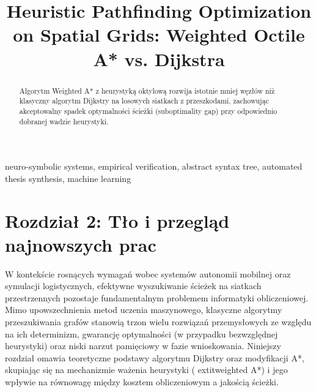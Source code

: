 \documentclass[conference]{IEEEtran}
\begin{document}
\title{Heuristic Pathfinding Optimization on Spatial Grids: Weighted Octile A* vs. Dijkstra}

\author{
}


\thispagestyle{plain}

\begin{abstract}
Algorytm Weighted A* z heurystyką oktylową rozwija istotnie mniej węzłów niż klasyczny algorytm Dijkstry na losowych siatkach z przeszkodami, zachowując akceptowalny spadek optymalności ścieżki (suboptimality gap) przy odpowiednio dobranej wadzie heurystyki.
\end{abstract}

\begin{IEEEkeywords}
neuro-symbolic systems, empirical verification, abstract syntax tree, automated thesis synthesis, machine learning
\end{IEEEkeywords}

\section{Rozdział 2: Tło i przegląd najnowszych prac}
W kontekście rosnących wymagań wobec systemów autonomii mobilnej oraz symulacji logistycznych, efektywne wyszukiwanie ścieżek na siatkach przestrzennych pozostaje fundamentalnym problemem informatyki obliczeniowej. Mimo upowszechnienia metod uczenia maszynowego, klasyczne algorytmy przeszukiwania grafów stanowią trzon wielu rozwiązań przemysłowych ze względu na ich determinizm, gwarancję optymalności (w przypadku bezwzględnej heurystyki) oraz niski narzut pamięciowy w fazie wnioskowania\cite{tang2026scaling}. Niniejszy rozdział omawia teoretyczne podstawy algorytmu Dijkstry oraz modyfikacji A*, skupiając się na mechanizmie ważenia heurystyki ( extit{weighted A*}) i jego wpływie na równowagę między kosztem obliczeniowym a jakością ścieżki.
\end{document}
